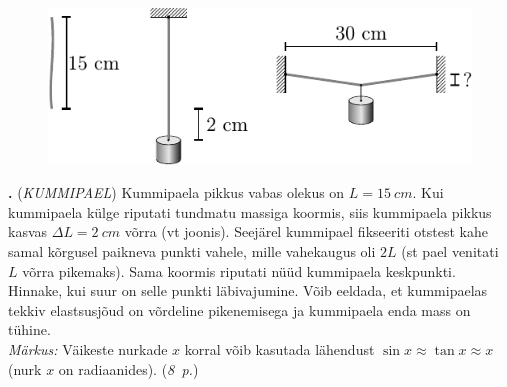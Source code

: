 \documentclass[11pt,a5paper]{article}
\newcommand{\numb}[1]{\vspace{5pt}\textbf{\large #1}}
\newcommand{\nimi}[1]{(\textsl{\small #1})}
\newcommand{\punktid}[1]{(\emph{#1~p.})}
\newcounter{ylesanne}
\newcommand{\yl}[1]{\addtocounter{ylesanne}{1}\numb{\theylesanne.} \nimi{#1} \newblock{}}
\newcommand{\autor}[1]{}%
\begin{document}
\newpage



\begin{figure}
    \begin{center}
        \vspace{5pt}
        \includegraphics[width=\linewidth]{kummipael_joonis.pdf}
    \end{center}
\end{figure}


\yl{KUMMIPAEL}
Kummipaela pikkus vabas olekus on $L=\SI{15}{cm}$. Kui kummipaela külge riputati tundmatu massiga koormis, siis kummipaela pikkus kasvas $\Delta L=\SI{2}{cm}$ võrra (vt joonis). Seejärel kummipael fikseeriti otstest kahe samal kõrgusel paikneva punkti vahele, mille vahekaugus oli $2L$ (st pael venitati $L$ võrra pikemaks). Sama koormis riputati nüüd kummipaela keskpunkti. Hinnake, kui suur on selle punkti läbivajumine. Võib eeldada, et kummipaelas tekkiv elastsusjõud on võrdeline pikenemisega ja kummipaela enda mass on tühine.\\ \emph{Märkus:} Väikeste nurkade $x$ korral võib kasutada lähendust $\sin{x} \approx \tan{x} \approx x$ (nurk $x$ on radiaanides).
\punktid{8} \autor{Valter Kiisk}
\end{document}
